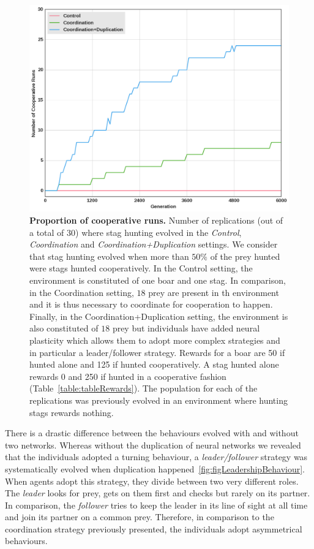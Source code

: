     \begin{figure}[h]
      \centering
        \includegraphics[width=0.7\linewidth]{fig/ArticleBio2/Fig4.png}
        \caption{\textbf{Proportion of cooperative runs.}
        Number of replications (out of a total of $30$) where stag hunting evolved in the \emph{Control}, \emph{Coordination} and \emph{Coordination+Duplication} settings. We consider that stag hunting evolved when more than $50\%$ of the prey hunted were stags hunted cooperatively. In the Control setting, the environment is constituted of one boar and one stag. In comparison, in the Coordination setting, $18$ prey are present in th environment and it is thus necessary to coordinate for cooperation to happen. Finally, in the Coordination+Duplication setting, the environment is also constituted of $18$ prey but individuals have added neural plasticity which allows them to adopt more complex strategies and in particular a leader/follower strategy. Rewards for a boar are 50 if hunted alone and 125 if hunted cooperatively. A stag hunted alone rewards 0 and 250 if hunted in a cooperative fashion (Table~\ref{table:tableRewards}). The population for each of the replications was previously evolved in an environment where hunting stags rewards nothing.}
      \label{fig:figRecyclingLeadership}
    \end{figure}

    There is a drastic difference between the behaviours evolved with and without two networks. Whereas without the duplication of neural networks we revealed that the individuals adopted a turning behaviour, a \emph{leader/follower} strategy was systematically evolved when duplication happened~\ref{fig:figLeadershipBehaviour}. When agents adopt this strategy, they divide between two very different roles. The \emph{leader} looks for prey, gets on them first and checks but rarely on its partner. In comparison, the \emph{follower} tries to keep the leader in its line of sight at all time and join its partner on a common prey. Therefore, in comparison to the coordination strategy previously presented, the individuals adopt asymmetrical behaviours. 

